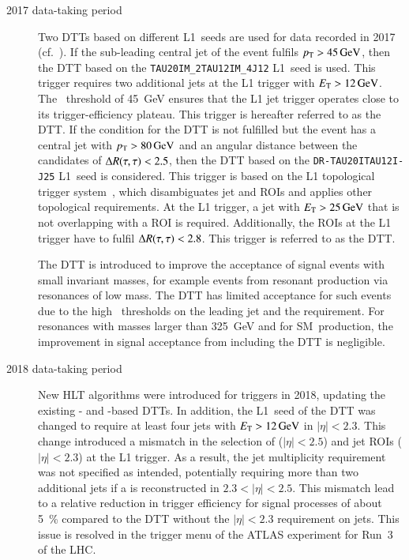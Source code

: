 \begin{description}
\item[2017 data-taking period] Two DTTs based on different L1~seeds are used for
  data recorded in 2017 (cf.~). If the sub-leading
  central jet of the event fulfils $p_{\text{T}} > \SI{45}{\ensuremath{\text{GeV}}}$, then the DTT based on
  the \texttt{TAU20IM\_2TAU12IM\_4J12} L1~seed is used. This trigger requires
  two additional jets at the L1 trigger with $\ET > \SI{12}{\GeV}$. The
  \pT~threshold of \SI{45}{\GeV} ensures that the L1 jet trigger operates close
  to its trigger-efficiency plateau. This trigger is hereafter referred to as
  the \FourJTwelve DTT. If the condition for the \FourJTwelve DTT is not
  fulfilled but the event has a central jet with $\pT > \SI{80}{\GeV}$ and an
  angular distance between the \tauhadvis candidates of $\Delta R(\tau, \tau) < 2.5$, then
  the DTT based on the \texttt{DR-TAU20ITAU12I-J25} L1~seed is considered. This
  trigger is based on the L1 topological trigger system~\cite{TRIG-2019-02},
  which disambiguates jet and \tauhadvis ROIs and applies other topological
  requirements. At the L1 trigger, a jet with $E_{\text{T}} > \SI{25}{\ensuremath{\text{GeV}}}$ that is not
  overlapping with a \tauhadvis ROI is required. Additionally, the \tauhadvis
  ROIs at the L1 trigger have to fulfil $\Delta R(\tau, \tau) < 2.8$. This trigger is
  referred to as the \LOneTopo DTT.

  The \FourJTwelve DTT is introduced to improve the acceptance of signal events
  with small \HH invariant masses, for example events from resonant \HH
  production via resonances of low mass. The \LOneTopo DTT has limited
  acceptance for such events due to the high \pT~thresholds on the leading jet
  and the \dRtautau requirement. For resonances with masses larger than
  \SI{325}{\GeV} and for SM~\HH production, the improvement in signal acceptance
  from including the \FourJTwelve DTT is negligible.

\item[2018 data-taking period] New HLT algorithms were introduced for \tauhadvis
  triggers in 2018, updating the existing \LOneTopo- and \FourJTwelve-based
  DTTs. In addition, the L1~seed of the \FourJTwelve DTT was changed to require
  at least four jets with $\ET > \SI{12}{\GeV}$ in $|\eta| < 2.3$. This change
  introduced a mismatch in the selection of \tauhadvis ($|\eta| < 2.5$) and jet
  ROIs ($|\eta| < 2.3$) at the L1 trigger. As a result, the jet multiplicity
  requirement was not specified as intended, potentially requiring more than two
  additional jets if a \tauhadvis is reconstructed in $2.3 < |\eta| < 2.5$. This
  mismatch lead to a relative reduction in trigger efficiency for signal
  processes of about \SI{5}{\percent} compared to the \FourJTwelve DTT without
  the $|\eta| < 2.3$ requirement on jets. This issue is resolved in the trigger
  menu of the ATLAS experiment for Run~3 of the LHC.
\end{description}


